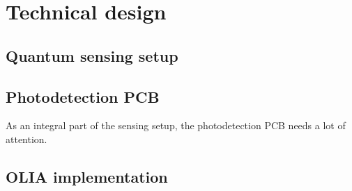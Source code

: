 \chapter{Technical design} \label{chap:tech_design}
\section{Quantum sensing setup}
\section{Photodetection PCB}
As an integral part of the sensing setup, the photodetection PCB needs a lot of attention. 

\section{OLIA implementation}
